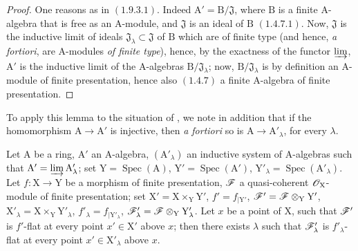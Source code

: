 \begin{proof}
One reasons as in $(1.9.3.1)$. Indeed $\mathrm{A}'=\mathrm{B}/\mathfrak{J}$, where $\mathrm{B}$ is a finite $\mathrm{A}$-algebra
that is free as an $\mathrm{A}$-module, and $\mathfrak{J}$ is an ideal of $\mathrm{B}$ $(1.4.7.1)$. Now, $\mathfrak{J}$ is the inductive
limit of ideals $\mathfrak{J}_\lambda\subset\mathfrak{J}$ of $\mathrm{B}$ which are of finite type (and hence, \emph{a fortiori}, are $\mathrm{A}$-modules \emph{of finite type}),
hence,
by the exactness of the functor $\varinjlim$, $\mathrm{A}'$ is the inductive limit of the $\mathrm{A}$-algebras $\mathrm{B}/\mathfrak{J}_\lambda$; now, $\mathrm{B}/\mathfrak{J}_\lambda$
is by definition an $\mathrm{A}$-module of finite presentation, hence also $(1.4.7)$ a finite $\mathrm{A}$-algebra
of finite presentation.
\end{proof}


To apply this lemma to the situation of , we note in addition
that if the homomorphism $\mathrm{A}\to\mathrm{A}'$ is injective, then
\emph{a fortiori} so is $\mathrm{A}\to\mathrm{A}'_\lambda$, for every
$\lambda$.

\begin{lemma}[11.5.5.2]
\label{IV.11.5.5.2}
Let $\mathrm{A}$ be a ring, $\mathrm{A}'$ an $\mathrm{A}$-algebra, $(\mathrm{A}'_\lambda)$ an inductive system
of $\mathrm{A}$-algebras such that $\mathrm{A}'=\varinjlim\mathrm{A}'_\lambda$; set $\mathrm{Y}=\operatorname{Spec}(\mathrm{A})$, $\mathrm{Y}'=\operatorname{Spec}(\mathrm{A}')$, $\mathrm{Y}'_\lambda=\operatorname{Spec}(\mathrm{A}'_\lambda)$.
Let $f:\mathrm{X}\to\mathrm{Y}$ be a morphism of finite presentation, $\mathscr{F}$ a quasi-coherent $\mathscr{O}_\mathrm{X}$-module of finite
presentation; set $\mathrm{X}'=\mathrm{X}\times_\mathrm{Y}\mathrm{Y}'$, $f'=f_{|\mathrm{Y}'}$, $\mathscr{F}'=\mathscr{F}\otimes_\mathrm{Y}\mathrm{Y}'$, $\mathrm{X}'_\lambda=\mathrm{X}\times_\mathrm{Y}\mathrm{Y}'_\lambda$, $f'_\lambda=f_{|\mathrm{Y}'_\lambda}$,
$\mathscr{F}'_\lambda=\mathscr{F}\otimes_\mathrm{Y}\mathrm{Y}'_\lambda$. Let $x$ be a point of $\mathrm{X}$, such that $\mathscr{F}'$ is $f'$-flat at every point $x'\in\mathrm{X}'$ above $x$;
then there exists $\lambda$ such that $\mathscr{F}'_\lambda$ is $f'_\lambda$-flat at every point $x'\in\mathrm{X}'_\lambda$ above $x$.
\end{lemma}

